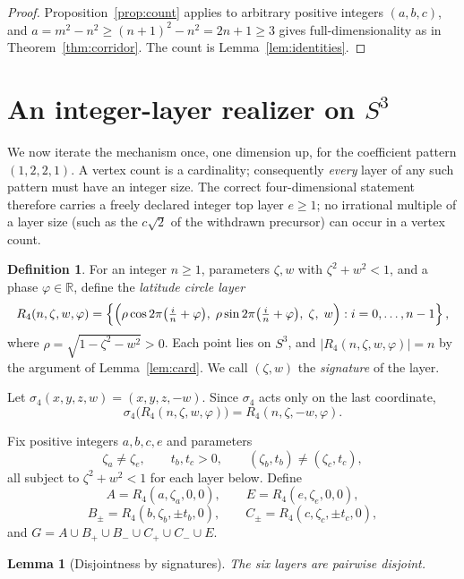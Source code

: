 \documentclass[11pt]{article}
\newtheorem{lemma}[theorem]{Lemma}
\theoremstyle{definition}
\newtheorem{definition}[theorem]{Definition}
\theoremstyle{remark}
\begin{document}
\begin{proof}
Proposition~\ref{prop:count} applies to arbitrary positive integers
$(a,b,c)$, and $a=m^2-n^2\ge (n+1)^2-n^2=2n+1\ge3$ gives
full-dimensionality as in Theorem~\ref{thm:corridor}. The count is
Lemma~\ref{lem:identities}.
\end{proof}

\section{An integer-layer realizer on $S^3$}\label{sec:s3}

We now iterate the mechanism once, one dimension up, for the coefficient
pattern $(1,2,2,1)$. A vertex count is a cardinality; consequently
\emph{every} layer of any such pattern must have an integer size. The
correct four-dimensional statement therefore carries a freely declared
integer top layer $e\ge1$; no irrational multiple of a layer size (such as
the $c\sqrt2$ of the withdrawn precursor) can occur in a vertex count.

\begin{definition}\label{def:layer4}
For an integer $n\ge1$, parameters $\zeta,w$ with $\zeta^2+w^2<1$, and a
phase $\varphi\in\mathbb R$, define the \emph{latitude circle layer}
\[
R_4(n,\zeta,w,\varphi)=\left\{\Bigl(\rho\cos 2\pi\bigl(\tfrac{i}{n}+\varphi\bigr),\;
\rho\sin 2\pi\bigl(\tfrac{i}{n}+\varphi\bigr),\; \zeta,\; w\Bigr) : i=0,\dots,n-1\right\},
\]
where $\rho=\sqrt{1-\zeta^2-w^2}>0$. Each point lies on $S^3$, and
$|R_4(n,\zeta,w,\varphi)|=n$ by the argument of Lemma~\ref{lem:card}.
We call $(\zeta,w)$ the \emph{signature} of the layer.
\end{definition}

Let $\sigma_4(x,y,z,w)=(x,y,z,-w)$. Since $\sigma_4$ acts only on the last
coordinate,
\[
\sigma_4\bigl(R_4(n,\zeta,w,\varphi)\bigr)=R_4(n,\zeta,-w,\varphi).
\]

Fix positive integers $a,b,c,e$ and parameters
\[
\zeta_a\ne\zeta_e, \qquad t_b,t_c>0, \qquad (\zeta_b,t_b)\ne(\zeta_c,t_c),
\]
all subject to $\zeta^2+w^2<1$ for each layer below. Define
\[
A=R_4(a,\zeta_a,0,0),\qquad E=R_4(e,\zeta_e,0,0),
\]
\[
B_\pm=R_4(b,\zeta_b,\pm t_b,0),\qquad
C_\pm=R_4(c,\zeta_c,\pm t_c,0),
\]
and $G=A\cup B_+\cup B_-\cup C_+\cup C_-\cup E$.

\begin{lemma}[Disjointness by signatures]\label{lem:sig}
The six layers are pairwise disjoint.
\end{lemma}
\end{document}
